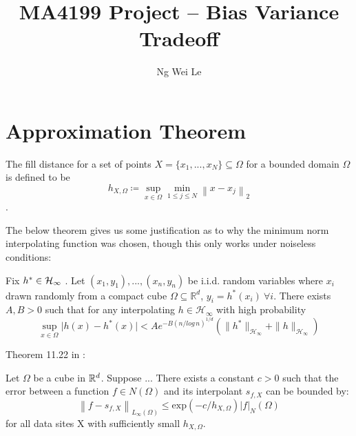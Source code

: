 \documentclass[english]{article}
\title{MA4199 Project -- Bias Variance Tradeoff}
\date{}
\author{Ng Wei Le}
\newcommand\norm[1]{\left\lVert#1\right\rVert}
\begin{document}
\maketitle
\section{Approximation Theorem} \label{sec:AppThm}
\begin{defn}
	The fill distance for a set of points $X = \{x_1, ..., x_N\} \subseteq \Omega$ for a bounded domain $\Omega$ is defined to be
	\[
	h_{X,\Omega} \coloneqq \sup_{x \in \Omega}\min_{1 \leq j \leq N} \norm{x- x_j}_2
	\].
\end{defn}
The below theorem gives us some justification as to why the minimum norm interpolating function was chosen, though this only works under noiseless conditions:
\begin{thm} \label{thm:approx}
	Fix $h^* \in \mathcal{H}_\infty $  .
Let $(x_1,y_1), ..., (x_n,y_n)$ be i.i.d. random variables where $x_i$ drawn randomly from a compact cube $\Omega \subseteq \mathbb{R}^d $,
$y_i = h^*(x_i) \: \forall i$. There exists $A, B > 0$ such that for any interpolating $h \in \mathcal{H}_\infty $ with high probability
\begin{equation*}
\sup_{x \in \Omega} \vert h(x) - h^*(x)\vert < A e^{-B(n/log \, n)^{1/d}} (\| h^* \|_{\mathcal{H}_\infty} + \| h \|_{\mathcal{H}_\infty})
\end{equation*}
\end{thm}
Theorem 11.22 in \cite{ScatteredDataApproximation}:

Let $\Omega$ be a cube in $\mathbb{R}^d$. Suppose ... There exists a constant $c > 0$ such that the error between a function $f \in N(\Omega)$ and its interpolant $s_{f,X}$ can be bounded by:
\begin{equation*}
\norm{f - s_{f,X}}_{L_\infty(\Omega)} \leq \text{exp}(-c/h_{X,\Omega})|f|_N(\Omega)
\end{equation*}
for all data sites X with sufficiently small $h_{X,\Omega}$.
\end{document}
